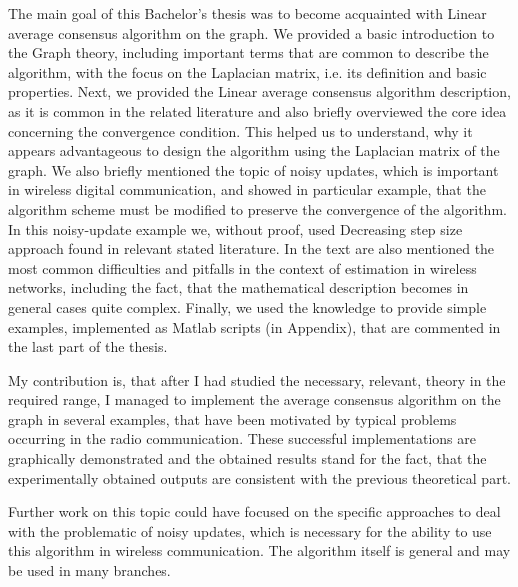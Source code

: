 The main goal of this Bachelor's thesis was to become acquainted with Linear average consensus algorithm on the graph. We provided a basic introduction to the Graph theory, including important terms that are common to describe the algorithm, with the focus on the Laplacian matrix, i.e. its definition and basic properties. Next, we provided the Linear average consensus algorithm description, as it is common in the related literature and also briefly overviewed the core idea concerning the convergence condition. This helped us to understand, why it appears advantageous to design the algorithm using the Laplacian matrix of the graph. We also briefly mentioned the topic of noisy updates, which is important in wireless digital communication, and showed in particular example, that the algorithm scheme must be modified to preserve the convergence of the algorithm. In this noisy-update example we, without proof, used Decreasing step size approach found in relevant stated literature. In the text are also mentioned the most common difficulties and pitfalls in the context of estimation in wireless networks, including the fact, that the mathematical description becomes in general cases quite complex. Finally, we used the knowledge to provide simple examples, implemented as Matlab scripts (in Appendix), that are commented in the last part of the thesis.

My contribution is, that after I had studied the necessary, relevant, theory in the required range, I managed to implement the average consensus algorithm on the graph in several examples, that have been motivated by typical problems occurring in the radio communication. These successful implementations are graphically demonstrated and the obtained results stand for the fact, that the experimentally obtained outputs are consistent with the previous theoretical part.

Further work on this topic could have focused on the specific approaches to deal with the problematic of noisy updates, which is necessary for the ability to use this algorithm in wireless communication. The algorithm itself is general and may be used in many branches.


